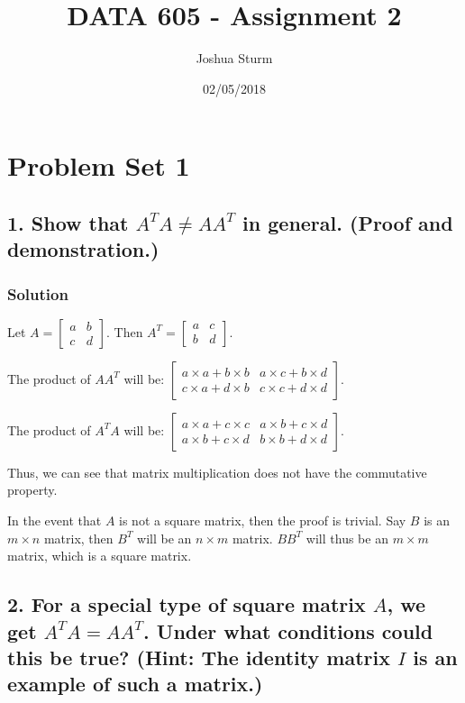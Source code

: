 \documentclass[]{article}
\title{DATA 605 - Assignment 2}
\author{Joshua Sturm}
\date{02/05/2018}
\begin{document}
\maketitle

\section{Problem Set 1}\label{problem-set-1}

\subsection{\texorpdfstring{1. Show that \(A^TA \neq AA^T\) in general.
(Proof and
demonstration.)}{1. Show that A\^{}TA \textbackslash{}neq AA\^{}T in general. (Proof and demonstration.)}}\label{show-that-ata-neq-aat-in-general.-proof-and-demonstration.}

\subsubsection{Solution}\label{solution}

Let \(A = \begin{bmatrix}a & b\\ c & d\end{bmatrix}.\) Then
\(A^T = \begin{bmatrix}a & c\\ b & d\end{bmatrix}\).

The product of \(AA^T\) will be:
\(\begin{bmatrix}a\times a + b\times b & a\times c + b\times d\\ c\times a + d\times b & c\times c + d \times d\end{bmatrix}\).

The product of \(A^TA\) will be:
\(\begin{bmatrix}a\times a + c\times c & a\times b + c\times d\\ a\times b + c\times d & b\times b + d \times d\end{bmatrix}\).

Thus, we can see that matrix multiplication does not have the
commutative property.

In the event that \(A\) is not a square matrix, then the proof is
trivial. Say \(B\) is an \(m\times n\) matrix, then \(B^T\) will be an
\(n\times m\) matrix. \(BB^T\) will thus be an \(m\times m\) matrix,
which is a square matrix.

\subsection{\texorpdfstring{2. For a special type of square matrix
\(A\), we get \(A^TA = AA^T\). Under what conditions could this be true?
(Hint: The identity matrix \(I\) is an example of such a
matrix.)}{2. For a special type of square matrix A, we get A\^{}TA = AA\^{}T. Under what conditions could this be true? (Hint: The identity matrix I is an example of such a matrix.)}}\label{for-a-special-type-of-square-matrix-a-we-get-ata-aat.-under-what-conditions-could-this-be-true-hint-the-identity-matrix-i-is-an-example-of-such-a-matrix.}
\end{document}
